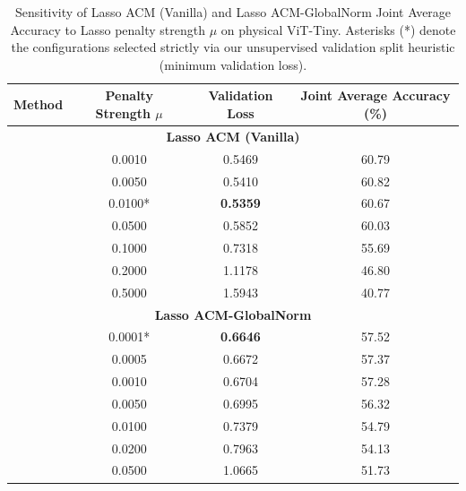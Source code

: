 \begin{table}[H]
\caption{Sensitivity of Lasso ACM (Vanilla) and Lasso ACM-GlobalNorm Joint Average Accuracy to Lasso penalty strength $\mu$ on physical ViT-Tiny. Asterisks (*) denote the configurations selected strictly via our unsupervised validation split heuristic (minimum validation loss).}
\label{tab:lasso_sensitivity}
\vskip 0.1in
\begin{center}
\begin{small}
\begin{sc}
\begin{tabular}{lccc}
\toprule
Method & Penalty Strength $\mu$ & Validation Loss & Joint Average Accuracy (\%) \\
\midrule
\multicolumn{4}{c}{\textbf{Lasso ACM (Vanilla)}} \\
\midrule
& 0.0010 & 0.5469 & 60.79 \\
& 0.0050 & 0.5410 & 60.82 \\
& 0.0100* & \textbf{0.5359} & 60.67 \\
& 0.0500 & 0.5852 & 60.03 \\
& 0.1000 & 0.7318 & 55.69 \\
& 0.2000 & 1.1178 & 46.80 \\
& 0.5000 & 1.5943 & 40.77 \\
\midrule
\multicolumn{4}{c}{\textbf{Lasso ACM-GlobalNorm}} \\
\midrule
& 0.0001* & \textbf{0.6646} & 57.52 \\
& 0.0005 & 0.6672 & 57.37 \\
& 0.0010 & 0.6704 & 57.28 \\
& 0.0050 & 0.6995 & 56.32 \\
& 0.0100 & 0.7379 & 54.79 \\
& 0.0200 & 0.7963 & 54.13 \\
& 0.0500 & 1.0665 & 51.73 \\
\bottomrule
\end{tabular}
\end{sc}
\end{small}
\end{center}
\end{table}

